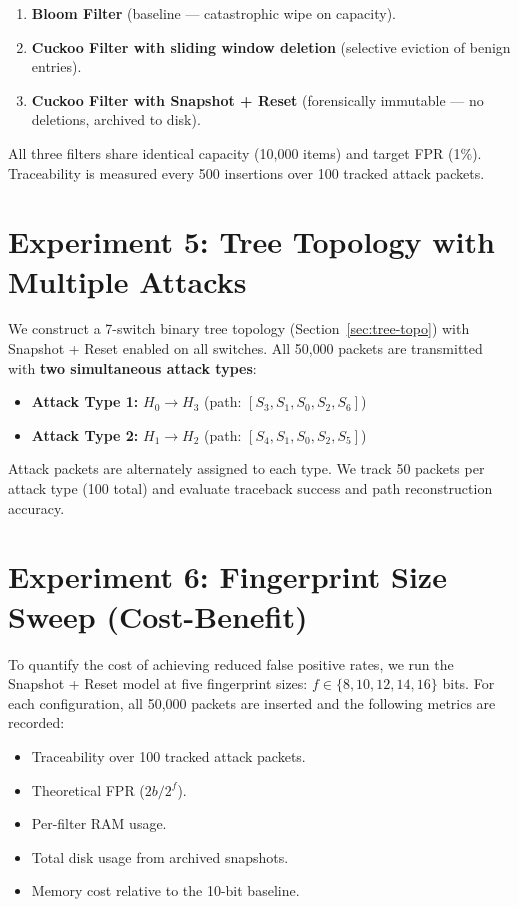 \documentclass[12pt, a4paper]{report}
\begin{document}
\begin{enumerate}[leftmargin=*]
  \item \textbf{Bloom Filter} (baseline --- catastrophic wipe on capacity).
  \item \textbf{Cuckoo Filter with sliding window deletion} (selective
  eviction of benign entries).
  \item \textbf{Cuckoo Filter with Snapshot + Reset} (forensically
  immutable --- no deletions, archived to disk).
\end{enumerate}

All three filters share identical capacity (10{,}000 items) and target
FPR (1\%). Traceability is measured every 500 insertions over 100 tracked
attack packets.

\section{Experiment 5: Tree Topology with Multiple Attacks}

We construct a 7-switch binary tree topology (Section~\ref{sec:tree-topo})
with Snapshot + Reset enabled on all switches. All 50{,}000 packets are
transmitted with \textbf{two simultaneous attack types}:

\begin{itemize}[leftmargin=*]
  \item \textbf{Attack Type 1:} $H_0 \to H_3$ (path: $[S_3, S_1, S_0, S_2, S_6]$)
  \item \textbf{Attack Type 2:} $H_1 \to H_2$ (path: $[S_4, S_1, S_0, S_2, S_5]$)
\end{itemize}

Attack packets are alternately assigned to each type. We track 50 packets
per attack type (100 total) and evaluate traceback success and path
reconstruction accuracy.

\section{Experiment 6: Fingerprint Size Sweep (Cost-Benefit)}

To quantify the cost of achieving reduced false positive rates, we run
the Snapshot + Reset model at five fingerprint sizes:
$f \in \{8, 10, 12, 14, 16\}$ bits. For each configuration, all 50{,}000
packets are inserted and the following metrics are recorded:

\begin{itemize}[leftmargin=*]
  \item Traceability over 100 tracked attack packets.
  \item Theoretical FPR ($2b/2^f$).
  \item Per-filter RAM usage.
  \item Total disk usage from archived snapshots.
  \item Memory cost relative to the 10-bit baseline.
\end{itemize}
\end{document}
